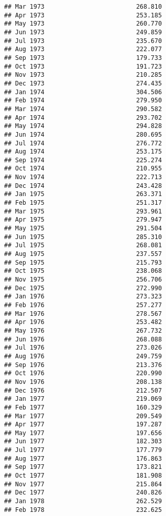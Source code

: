 \documentclass[
]{article}
\begin{document}
\begin{verbatim}
## Mar 1973                         268.810
## Apr 1973                         253.185
## May 1973                         260.770
## Jun 1973                         249.859
## Jul 1973                         235.670
## Aug 1973                         222.077
## Sep 1973                         179.733
## Oct 1973                         191.723
## Nov 1973                         210.285
## Dec 1973                         274.435
## Jan 1974                         304.506
## Feb 1974                         279.950
## Mar 1974                         290.582
## Apr 1974                         293.702
## May 1974                         294.828
## Jun 1974                         280.695
## Jul 1974                         276.772
## Aug 1974                         253.175
## Sep 1974                         225.274
## Oct 1974                         210.955
## Nov 1974                         222.713
## Dec 1974                         243.428
## Jan 1975                         263.371
## Feb 1975                         251.317
## Mar 1975                         293.961
## Apr 1975                         279.947
## May 1975                         291.504
## Jun 1975                         285.310
## Jul 1975                         268.081
## Aug 1975                         237.557
## Sep 1975                         215.793
## Oct 1975                         238.068
## Nov 1975                         256.706
## Dec 1975                         272.990
## Jan 1976                         273.323
## Feb 1976                         257.277
## Mar 1976                         278.567
## Apr 1976                         253.482
## May 1976                         267.732
## Jun 1976                         268.088
## Jul 1976                         273.026
## Aug 1976                         249.759
## Sep 1976                         213.376
## Oct 1976                         220.990
## Nov 1976                         208.138
## Dec 1976                         212.507
## Jan 1977                         219.069
## Feb 1977                         160.329
## Mar 1977                         209.549
## Apr 1977                         197.287
## May 1977                         197.656
## Jun 1977                         182.303
## Jul 1977                         177.779
## Aug 1977                         176.863
## Sep 1977                         173.821
## Oct 1977                         181.908
## Nov 1977                         215.864
## Dec 1977                         240.826
## Jan 1978                         262.529
## Feb 1978                         232.625

\end{verbatim}
\end{document}
